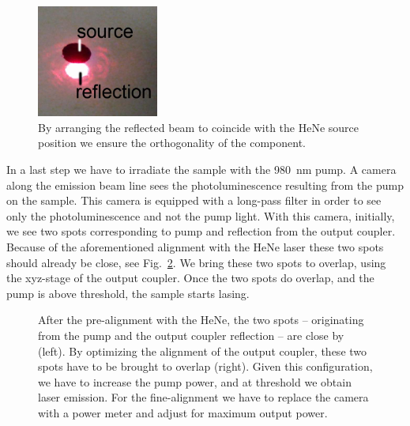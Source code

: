 \begin{figure}
\centering
\includegraphics[width=4cm]{img/appendix/HeNe.jpg}
\caption{By arranging the reflected beam to coincide with the HeNe source position
we ensure the orthogonality of the component.}
\label{img:HeNe}
\end{figure}

In a last step we have to irradiate the sample with the 980~nm pump.
A camera along the emission beam line
sees the photoluminescence resulting from the pump on the sample.
This camera is equipped with a long-pass filter
in order to see only the photoluminescence
and not the pump light.
With this camera,
initially,
we see two spots corresponding to
pump and reflection from the output coupler.
Because of the aforementioned alignment with the HeNe laser
these two spots should already be close,
see Fig.~\ref{img:spot_overlap}.
We bring these two spots to overlap,
using the xyz-stage of the output coupler.
Once the two spots do overlap,
and the pump is above threshold,
the sample starts lasing.

\begin{figure}
\centering
{}
\caption{After the pre-alignment
with the HeNe,
the two spots --
originating
from the pump
and the output coupler reflection --
are close by (left).
By optimizing the alignment
of the output coupler,
these two spots
have to be brought to overlap (right).
Given this configuration,
we have to increase the pump power,
and at threshold we obtain laser emission.
For the fine-alignment
we have to replace the camera
with a power meter
and adjust for maximum output power.}
\label{img:spot_overlap}
\end{figure}

